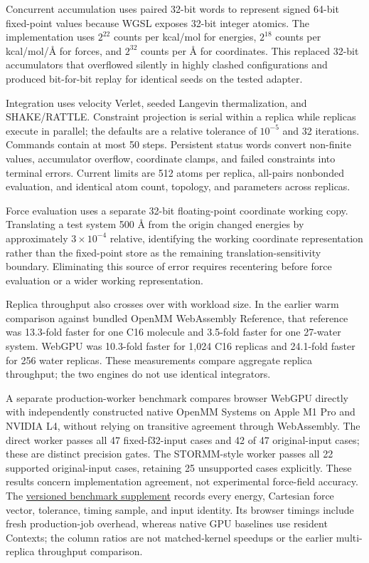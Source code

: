 \documentclass[11pt]{article}
\begin{document}
\begin{small}
Concurrent accumulation uses paired 32-bit words to represent signed 64-bit fixed-point values because WGSL exposes 32-bit integer atomics. The implementation uses $2^{22}$ counts per kcal/mol for energies, $2^{18}$ counts per kcal/mol/\AA{} for forces, and $2^{32}$ counts per \AA{} for coordinates. This replaced 32-bit accumulators that overflowed silently in highly clashed configurations and produced bit-for-bit replay for identical seeds on the tested adapter.

Integration uses velocity Verlet, seeded Langevin thermalization, and SHAKE/RATTLE. Constraint projection is serial within a replica while replicas execute in parallel; the defaults are a relative tolerance of $10^{-5}$ and 32 iterations. Commands contain at most 50 steps. Persistent status words convert non-finite values, accumulator overflow, coordinate clamps, and failed constraints into terminal errors. Current limits are 512 atoms per replica, all-pairs nonbonded evaluation, and identical atom count, topology, and parameters across replicas.

Force evaluation uses a separate 32-bit floating-point coordinate working copy. Translating a test system 500 \AA{} from the origin changed energies by approximately $3 \times 10^{-4}$ relative, identifying the working coordinate representation rather than the fixed-point store as the remaining translation-sensitivity boundary. Eliminating this source of error requires recentering before force evaluation or a wider working representation.

Replica throughput also crosses over with workload size. In the earlier warm comparison against bundled OpenMM WebAssembly Reference, that reference was 13.3-fold faster for one C16 molecule and 3.5-fold faster for one 27-water system. WebGPU was 10.3-fold faster for 1,024 C16 replicas and 24.1-fold faster for 256 water replicas. These measurements compare aggregate replica throughput; the two engines do not use identical integrators.

A separate production-worker benchmark compares browser WebGPU directly with independently constructed native OpenMM Systems on Apple M1 Pro and NVIDIA L4, without relying on transitive agreement through WebAssembly. The direct worker passes all 47 fixed-f32-input cases and 42 of 47 original-input cases; these are distinct precision gates. The STORMM-style worker passes all 22 supported original-input cases, retaining 25 unsupported cases explicitly. These results concern implementation agreement, not experimental force-field accuracy. The \href{https://github.com/rafwiewiora/molarium/tree/2ab30383d6160349aa3b1e980f7239d6854b329d/benchmarks/simulation}{versioned benchmark supplement} records every energy, Cartesian force vector, tolerance, timing sample, and input identity. Its browser timings include fresh production-job overhead, whereas native GPU baselines use resident Contexts; the column ratios are not matched-kernel speedups or the earlier multi-replica throughput comparison.


\end{small}
\end{document}
